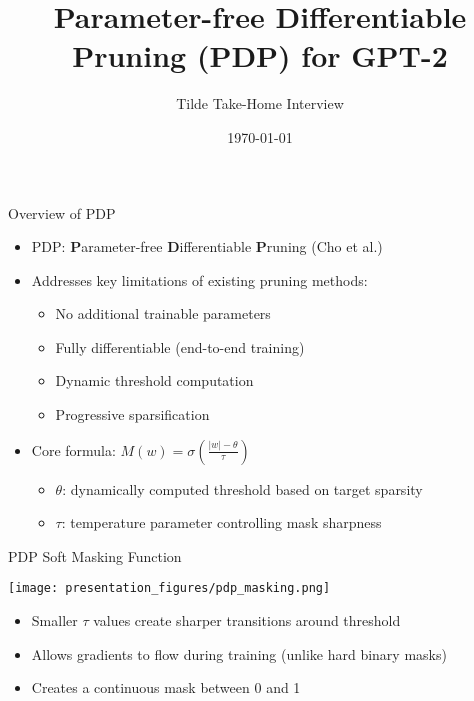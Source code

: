 \documentclass{beamer}
\title{Parameter-free Differentiable Pruning (PDP) for GPT-2}
\author{Tilde Take-Home Interview}
\date{\today}
\begin{document}
\begin{frame}
\titlepage
\end{frame}

\begin{frame}{Overview of PDP}
\begin{itemize}
    \item PDP: \textbf{P}arameter-free \textbf{D}ifferentiable \textbf{P}runing (Cho et al.)
    \item Addresses key limitations of existing pruning methods:
    \begin{itemize}
        \item No additional trainable parameters
        \item Fully differentiable (end-to-end training)
        \item Dynamic threshold computation
        \item Progressive sparsification
    \end{itemize}
    \item Core formula: $M(w) = \sigma\left(\frac{|w| - \theta}{\tau}\right)$
    \begin{itemize}
        \item $\theta$: dynamically computed threshold based on target sparsity
        \item $\tau$: temperature parameter controlling mask sharpness
    \end{itemize}
\end{itemize}
\end{frame}

\begin{frame}{PDP Soft Masking Function}
\begin{center}
\texttt{[image: presentation\_figures/pdp\_masking.png]}
\end{center}
\begin{itemize}
    \item Smaller $\tau$ values create sharper transitions around threshold
    \item Allows gradients to flow during training (unlike hard binary masks)
    \item Creates a continuous mask between 0 and 1
\end{itemize}
\end{frame}
\end{document}
